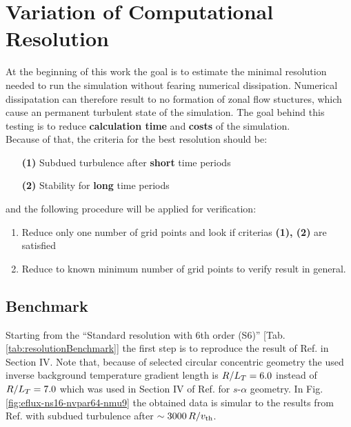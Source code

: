 \section{Variation of Computational Resolution}
\label{sec:variationsofresolution}

At the beginning of this work the goal is to estimate the minimal resolution needed to run the simulation without fearing numerical dissipation. Numerical dissipatation can therefore result to no formation of zonal flow stuctures, which cause an permanent turbulent state of the simulation. The goal behind this testing is to reduce \textbf{calculation time} and \textbf{costs} of the simulation. \\
Because of that, the criteria for the best resolution should be:
\begin{enumerate}
	\item[\textbf{(1)}] Subdued turbulence after \textbf{short} time periods
	\item[\textbf{(2)}] Stability for \textbf{long} time periods 
\end{enumerate}
and the following procedure will be applied for verification:
\begin{enumerate}
	\item Reduce only one number of grid points and look if criterias \textbf{(1), (2)} are satisfied
	\item Reduce to known minimum number of grid points to verify result in general.
\end{enumerate}

\subsection{Benchmark}
\label{sub:benchmark}

Starting from the \enquote{Standard resolution with 6th order (S6)} [Tab. \ref{tab:resolutionBenchmark}] the first step is to reproduce the result of Ref.  in Section IV. Note that, because of selected circular concentric geometry the used inverse background temperature gradient length is $R/L_T = 6.0$ instead of $R/L_T = 7.0$ which was used in Section IV of Ref.  for $s$-$\alpha$ geometry. In Fig. \ref{fig:eflux-ns16-nvpar64-nmu9} the obtained data is simular to the results from Ref.  with subdued turbulence after $\sim 3000\,R/v_{\mathrm{th}}$. 


